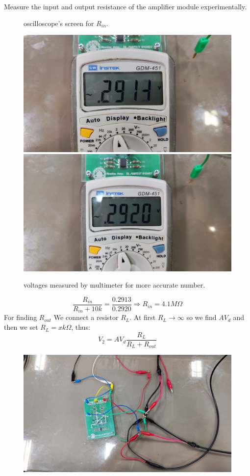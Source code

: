\documentclass[11pt]{article}
\newcommand{\PicScale}{0.2}
\begin{document}
\begin{question}
\begin{subquestion}{Measure the input and output resistance of the amplifier module experimentally.}
{\begin{figure}[H]
                \caption{oscilloscope's screen for $R_{in}$.}
            \end{figure}
            \begin{figure}[H]
                \centering
                \includegraphics[scale=0.1,angle=0]{Fig/46.jpeg}
                \includegraphics[scale=0.1,angle=0]{Fig/47.jpeg}
                \caption{voltages measured by multimeter for more accurate number.}
            \end{figure}
            \[
                \frac{R_{in}}{R_{in} + 10k} = \frac{0.2913}{0.2920} \Rightarrow R_{in} = 4.1M\Omega
            \]
            For finding $R_{out}$ We connect a resistor $R_L$. At first $R_L \to \infty$ so we find $AV_d$ and then we set $R_L = xk\Omega$, thus:
            \[
                V_2 = AV_d \frac{R_L}{R_L + R_{out}}
            \]
            \begin{figure}[H]
                \centering
                \includegraphics[scale=\PicScale,angle=0]{Fig/48.jpeg}

\end{figure}}
\end{subquestion}
\end{question}
\end{document}
